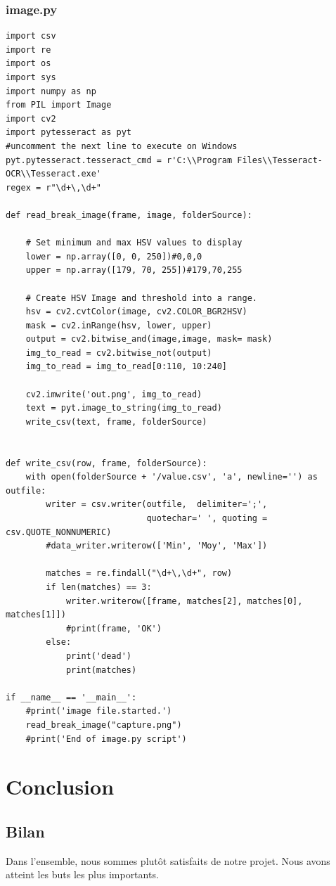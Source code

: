 \documentclass[12pt]{article}
\begin{document}
\subsubsection{image.py}
\begin{lstlisting}
import csv
import re
import os
import sys
import numpy as np
from PIL import Image
import cv2
import pytesseract as pyt
#uncomment the next line to execute on Windows
pyt.pytesseract.tesseract_cmd = r'C:\\Program Files\\Tesseract-OCR\\Tesseract.exe'
regex = r"\d+\,\d+"

def read_break_image(frame, image, folderSource):
    
    # Set minimum and max HSV values to display
    lower = np.array([0, 0, 250])#0,0,0
    upper = np.array([179, 70, 255])#179,70,255

    # Create HSV Image and threshold into a range.
    hsv = cv2.cvtColor(image, cv2.COLOR_BGR2HSV)
    mask = cv2.inRange(hsv, lower, upper)
    output = cv2.bitwise_and(image,image, mask= mask)
    img_to_read = cv2.bitwise_not(output)
    img_to_read = img_to_read[0:110, 10:240]

    cv2.imwrite('out.png', img_to_read)
    text = pyt.image_to_string(img_to_read)
    write_csv(text, frame, folderSource)


def write_csv(row, frame, folderSource):
    with open(folderSource + '/value.csv', 'a', newline='') as outfile:
        writer = csv.writer(outfile,  delimiter=';',
                            quotechar=' ', quoting = csv.QUOTE_NONNUMERIC)
        #data_writer.writerow(['Min', 'Moy', 'Max'])
        
        matches = re.findall("\d+\,\d+", row)
        if len(matches) == 3:
            writer.writerow([frame, matches[2], matches[0], matches[1]])
            #print(frame, 'OK')
        else:
            print('dead')
            print(matches)

if __name__ == '__main__':
    #print('image file.started.')
    read_break_image("capture.png")
    #print('End of image.py script')

\end{lstlisting}

\section{Conclusion}
\subsection{Bilan}
Dans l’ensemble, nous sommes plutôt satisfaits de notre projet. Nous avons atteint les buts les plus importants.
\end{document}
